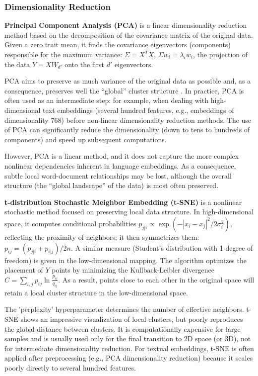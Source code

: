 \subsubsection{Dimensionality Reduction}
\textbf{Principal Component Analysis (PCA)} is a linear dimensionality reduction method based
on the decomposition of the covariance matrix of the original data. Given a zero trait mean,
it finds the covariance eigenvectors (components) responsible for the maximum variance:
$\Sigma = X^T X$, $\Sigma w_i = \lambda_i w_i$, the projection of the data $Y = XW_{d'}$
onto the first $d'$ eigenvectors.

PCA aims to preserve as much variance of the original data as possible and, as a consequence,
preserves well the “global” cluster structure \parencite{TRIMAP2019}. In practice, PCA is often
used as an intermediate step: for example, when dealing with high-dimensional text embeddings
(several hundred features, e.g., embeddings of dimensionality 768) before non-linear
dimensionality reduction methods. The use of PCA can significantly reduce the dimensionality
(down to tens to hundreds of components) and speed up subsequent computations\parencite{huang2022towards}.

However, PCA is a linear method, and it does not capture the more complex nonlinear dependencies
inherent in language embeddings. As a consequence, subtle local word-document relationships
may be lost, although the overall structure (the “global landscape” of the data) is most often
preserved.

\textbf{t-distribution Stochastic Meighbor Embedding (t-SNE)} is a nonlinear stochastic method focused
on preserving local data structure. In high-dimensional space, it computes conditional probabilities
$p_{j|i} \propto \exp(-|x_i-x_j|^2/2\sigma_i^2)$, reflecting the proximity of neighbors; it then
symmetrizes them: $p_{ij}=(p_{j|i}+p_{i|j})/2n$. A similar measure (Student's distribution with 1 degree
of freedom) is given in the low-dimensional mapping. The algorithm optimizes the placement of $Y$ points
by minimizing the Kullback-Leibler divergence $C = \sum_{i,j} p_{ij}\ln\frac{p_{ij}}{q_{ij}}$.
As a result, points close to each other in the original space will retain a local cluster structure
in the low-dimensional space.

The 'perplexity' hyperparameter determines the number of effective neighbors. t-SNE shows an impressive
visualization of local clusters, but poorly reproduces the global distance between clusters.
It is computationally expensive for large samples and is usually used only for the final transition
to 2D space (or 3D), not for intermediate dimensionality reduction. For textual embeddings, t-SNE is
often applied after preprocessing (e.g., PCA dimensionality reduction) because it scales poorly directly
to several hundred features.

